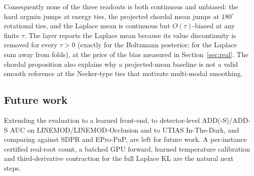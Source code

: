 Consequently none of the three readouts is both continuous and unbiased: the hard argmin jumps at energy ties, the projected chordal mean jumps at $180^\circ$ rotational ties, and the Laplace mean is continuous but $O(\tau)$-biased at any finite $\tau$. The layer reports the Laplace mean because its value discontinuity is removed for every $\tau>0$ (exactly for the Boltzmann posterior; for the Laplace sum away from folds), at the price of the bias measured in Section~\ref{sec:real}. The chordal proposition also explains why a projected-mean baseline is not a valid smooth reference at the Necker-type ties that motivate multi-modal smoothing.

\subsection{Future work}

Extending the evaluation to a learned front-end, to detector-level ADD(-S)/ADD-S AUC on LINEMOD/LINEMOD-Occlusion and to UTIAS In-The-Dark, and comparing against SDPR and EPro-PnP, are left for future work. A per-instance certified real-root count, a batched GPU forward, learned temperature calibration and third-derivative contraction for the full Laplace KL are the natural next steps.
